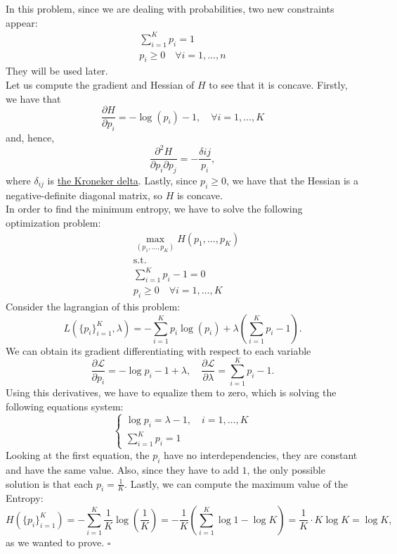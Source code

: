 \documentclass[11pt,table]{article}
\newcommand{\qed}{\hfill $\square$}
\begin{document}
	
	In this problem, since we are dealing with probabilities, two new constraints appear:
	\begin{align*}
		\sum_{i=1}^K p_i = 1 \\
		p_i \geq 0 \quad \forall i =1,\dots,n
	\end{align*}
	They will be used later.\\
	
	Let us compute the gradient and Hessian of \(H\) to see that it is concave. Firstly, we have that
	\[
	\frac{\partial H}{\partial p_i} = - \log(p_i) - 1, \quad \forall i = 1,\dots,K
	\]
	and, hence,
	\[
	\frac{\partial^2 H}{\partial p_i \partial p_j} = - \frac{\delta{ij}}{p_i},
	\]
	where $\delta_{ij}$ is \href{https://en.wikipedia.org/wiki/Kronecker_delta}{the Kroneker delta}. Lastly, since \(p_i \geq 0\), we have that the Hessian is a negative-definite diagonal matrix, so \(H\) is concave.\\
	
	In order to find the minimum entropy, we have to solve the following optimization problem:
	\begin{align*}
		& \max_{(p_1,\dots,p_K)} H(p_1,\dots,p_K) \\
		& \text{s.t.}                             \\
		& \sum_{i=1}^K p_i -1 = 0                 \\
		& p_i \geq 0 \quad \forall i =1,\dots,K
	\end{align*}
	Consider the lagrangian of this problem:
	\[
	L\left(\{p_i\}_{i=1}^K, \lambda\right) = - \sum_{i=1}^K p_i \log(p_i) + \lambda\left(\sum_{i=1}^K p_i -1\right).
	\]
	We can obtain its gradient differentiating with respect to each variable
	\[
	\frac{\partial \mathcal L}{\partial p_i} = - \log p_i - 1 + \lambda, \quad \frac{\partial \mathcal L}{\partial \lambda} =  \sum_{i=1}^K p_i -1.
	\]
	Using this derivatives, we have to equalize them to zero, which is solving the following equations system:
	\[
	\begin{cases}
		\log p_i = \lambda - 1, \quad i = 1,\dots,K \\
		\sum_{i=1}^K p_i = 1
	\end{cases}
	\]
	Looking at the first equation, the \(p_i\) have no interdependencies, they are constant and have the same value. Also, since they have to add \(1\), the only possible solution is that each \(p_i = \frac{1}{K}\). Lastly, we can compute the maximum value of the Entropy:
	\[
	H\left(\{p_i\}_{i=1}^K\right) = - \sum_{i=1}^K \frac{1}{K} \log \left(\frac{1}{K}\right)  = - \frac{1}{K} \left(\sum_{i=1}^K \log 1 - \log K\right) = \frac{1}{K} \cdot K \log K = \log K,
	\]
	as we wanted to prove. \qed
	
\end{document}
